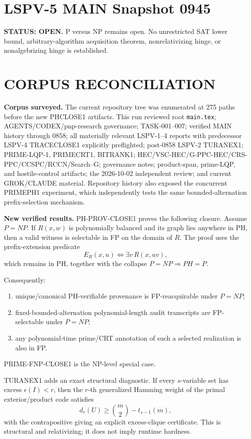 \documentclass[11pt]{article}
\begin{document}
\section*{LSPV-5 MAIN Snapshot 0945}

\textbf{STATUS: OPEN.} P versus NP remains open. No unrestricted SAT lower bound,
arbitrary-algorithm acquisition theorem, nonrelativizing hinge, or nonalgebrizing hinge is established.

\section*{CORPUS RECONCILIATION}
\textbf{Corpus surveyed.}
The current repository tree was enumerated at 275 paths before the new PHCLOSE1 artifacts.
This run reviewed root \texttt{main.tex}; AGENTS/CODEX/pnp-research governance; TASK-001--007;
verified MAIN history through 0858; all materially relevant LSPV-1--4 reports with predecessor
LSPV-4 TRACECLOSE1 explicitly preflighted; post-0858 LSPV-2 TURANEX1; PRIME-LQP-1, PRIMECRT1,
BITRANK1; HEC/VSC-HEC/G-PPC-HEC/CRS-PPC/CCSPC/RCCN/Search--G; governance notes; product-span,
prime-LQP, and hostile-control artifacts; the 2026-10-02 independent review; and current GROK/CLAUDE
material. Repository history also exposed the concurrent PRIMEPH1 experiment, which independently
tests the same bounded-alternation prefix-selection mechanism.

\textbf{New verified results.}
PH-PROV-CLOSE1 proves the following closure. Assume \(P=NP\). If \(R(x,w)\) is polynomially
balanced and its graph lies anywhere in PH, then a valid witness is selectable in FP on the domain
of \(R\). The proof uses the prefix-extension predicate
\[
E_R(x,u)\iff \exists v\,R(x,uv),
\]
which remains in PH, together with the collapse \(P=NP\Rightarrow PH=P\).

Consequently:
\begin{enumerate}
\item unique/canonical PH-verifiable provenance is FP-reacquirable under \(P=NP\);
\item fixed-bounded-alternation polynomial-length audit transcripts are FP-selectable under \(P=NP\);
\item any polynomial-time prime/CRT annotation of such a selected realization is also in FP.
\end{enumerate}
PRIME-FNP-CLOSE1 is the NP-level special case.

TURANEX1 adds an exact structural diagnostic. If every \(s\)-variable set has excess
\(\epsilon(I)<r\), then the \(r\)-th generalized Hamming weight of the primal exterior/product code
satisfies
\[
d_r(U)\ge \binom m2-t_{s-1}(m),
\]
with the contrapositive giving an explicit excess-clique certificate. This is structural and
relativizing; it does not imply runtime hardness.
\end{document}
